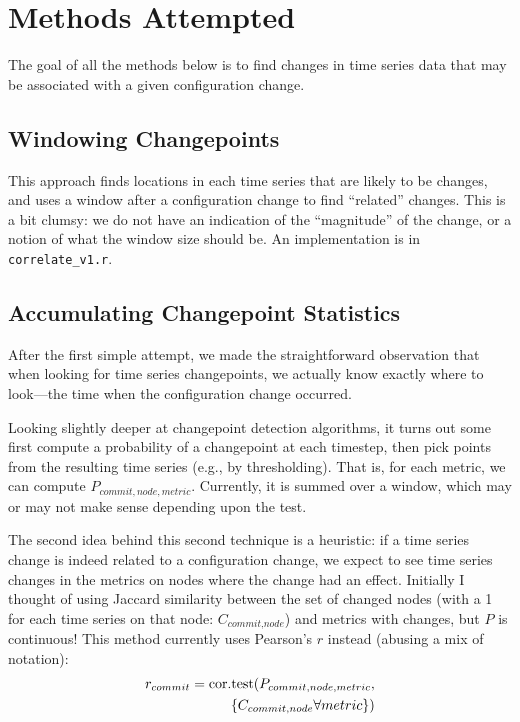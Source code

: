 \documentclass[twocolumn]{article}
\begin{document}
\section{Methods Attempted}
The goal of all the methods below is to find changes in time series data that may be associated with a given configuration change.

\subsection{Windowing Changepoints}
This approach finds locations in each time series that are likely to be changes, and uses a window after a configuration change to find ``related'' changes. This is a bit clumsy: we do not have an indication of the ``magnitude'' of the change, or a notion of what the window size should be. An implementation is in \texttt{correlate\_v1.r}.

\subsection{Accumulating Changepoint Statistics}
After the first simple attempt, we made the straightforward observation that when looking for time series changepoints, we actually know exactly where to look---the time when the configuration change occurred. 

Looking slightly deeper at changepoint detection algorithms, it turns out some first compute a probability of a changepoint at each timestep, then pick points from the resulting time series (e.g., by thresholding). That is, for each metric, we can compute $P_{\textit{commit},\textit{node},\textit{metric}}$. Currently, it is summed over a window, which may or may not make sense depending upon the test.

The second idea behind this second technique is a heuristic: if a time series change is indeed related to a configuration change, we expect to see time series changes in the metrics on nodes where the change had an effect. Initially I thought of using Jaccard similarity between the set of changed nodes (with a 1 for each time series on that node: $C_{\textit{commit},\textit{node}}$) and metrics with changes, but $P$ is continuous! This method currently uses Pearson's $r$ instead (abusing a mix of notation):
\begin{align*}
r_{commit}=\textup{cor.test}(P_{commit,node,metric}, \\ \{C_{commit,node} \forall metric\})
\end{align*}
\end{document}
